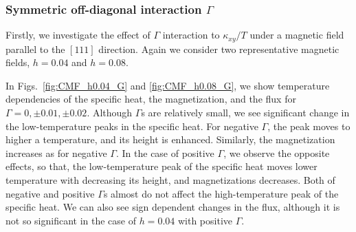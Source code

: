 \documentclass[reprint,amsmath,amssymb,aps,prx]{revtex4-2}
\begin{document}
   \subsubsection{Symmetric off-diagonal interaction $\Gamma$} 
   Firstly, we investigate the effect of $\Gamma$ interaction to $\kappa_{xy}/T$ under a magnetic field parallel to the $[111]$ direction. Again we consider two representative magnetic fields, $h=0.04$ and $h=0.08$.

In Figs.~\ref{fig:CMF_h0.04_G} and \ref{fig:CMF_h0.08_G}, we show temperature dependencies of the specific heat, the magnetization, and the flux for $\Gamma = 0, \pm 0.01, \pm 0.02$. Although $\Gamma$s are relatively small, we see significant change in the low-temperature peaks in the specific heat. For negative $\Gamma$, the peak moves to higher a temperature, and its height is enhanced. Similarly, the magnetization increases as for negative $\Gamma$. In the case of positive $\Gamma$, we observe the opposite effects, so that, the low-temperature peak of the specific heat moves lower temperature with decreasing its height, and magnetizations decreases. Both of negative and positive $\Gamma$s almost do not affect the high-temperature peak of the specific heat. We can also see sign dependent changes in the flux, although it is not so significant in the case of $h=0.04$ with positive $\Gamma$. 
\end{document}
